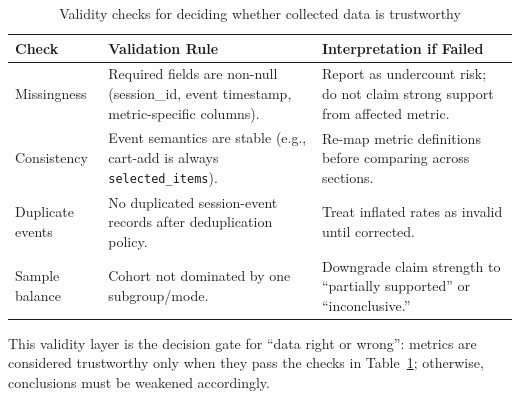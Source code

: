 \begin{table}[H]
\centering
\begin{tabular}{p{4.0cm}p{4.7cm}p{5.0cm}}
\toprule
\textbf{Check} & \textbf{Validation Rule} & \textbf{Interpretation if Failed}\\
\midrule
Missingness & Required fields are non-null (session\_id, event timestamp, metric-specific columns). & Report as undercount risk; do not claim strong support from affected metric.\\
Consistency & Event semantics are stable (e.g., cart-add is always \texttt{selected\_items}). & Re-map metric definitions before comparing across sections.\\
Duplicate events & No duplicated session-event records after deduplication policy. & Treat inflated rates as invalid until corrected.\\
Sample balance & Cohort not dominated by one subgroup/mode. & Downgrade claim strength to ``partially supported'' or ``inconclusive.''\\
\bottomrule
\end{tabular}
\caption{Validity checks for deciding whether collected data is trustworthy}
\label{tab:data_validity_checks}
\end{table}

This validity layer is the decision gate for ``data right or wrong'': metrics are considered trustworthy only when they pass the checks in Table~\ref{tab:data_validity_checks}; otherwise, conclusions must be weakened accordingly.
